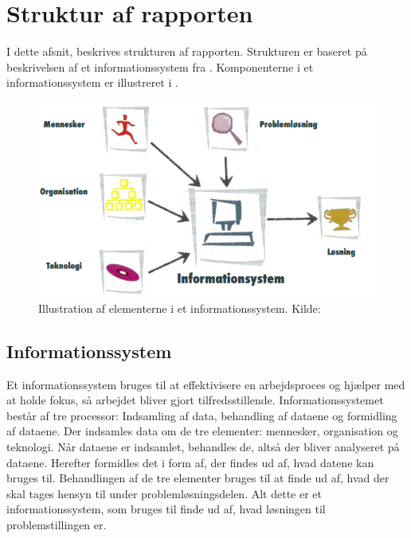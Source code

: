 \section{Struktur af rapporten}\label{sec:struktur-af-problemanalyse}

I dette afsnit, beskrives strukturen af rapporten. Strukturen er baseret på beskrivelsen af et
informationssystem fra \citet{Laudon1999}. Komponenterne i et informationssystem er illustreret i
.

\begin{figure}[htbp]
  \centering
  \includegraphics{images/kontekstmodel/metode.png}
  \caption[Metode for Kontekstmodellen]{Illustration af elementerne i et informationssystem. Kilde:
  \protect\citet{Laudon1999}}
  \label{fig:kontekstmodel}
\end{figure}


\subsection{Informationssystem}\label{subsec:Informationssystem}

Et informationssystem bruges til at effektivisere en arbejdsproces og hjælper med at holde fokus, så arbejdet
bliver gjort tilfredsstillende. Informationssystemet består af tre processor: Indsamling af data, behandling
af dataene og formidling af dataene. Der indsamles data om de tre elementer: mennesker, organisation og
teknologi. Når dataene er indsamlet, behandles de, altså der bliver analyseret på dataene. Herefter formidles
det i form af, der findes ud af, hvad datene kan bruges til. Behandlingen af de tre elementer bruges til at
finde ud af, hvad der skal tages hensyn til under problemløsningsdelen. Alt dette er et informationssystem,
som bruges til finde ud af, hvad løsningen til problemstillingen er.


